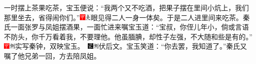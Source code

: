 一时摆上茶果吃茶，宝玉便说：“我两个又不吃酒，把果子摆在里间小炕上，我们那里坐去，省得闹你们。”{\includegraphics[width=3mm]{../Images/00002}\includegraphics[width=3mm]{../Images/00012}\footnotesize \kaishu 眼见得二人一身一体矣。}于是二人进里间来吃茶。秦氏一面张罗与凤姐摆酒果，一面忙进来嘱宝玉道：“宝叔，你侄儿年小，倘或言语不防头，你千万看着我，不要理他。他虽腼腆，却性子左强，不大随和些是有的。”{{\includegraphics[width=3mm]{../Images/00002}\includegraphics[width=3mm]{../Images/00011}\footnotesize \kaishu 实写秦钟，双映宝玉。　}\includegraphics[width=3mm]{../Images/00006}\includegraphics[width=3mm]{../Images/00011}\footnotesize \kaishu 伏后文。}宝玉笑道：“你去罢，我知道了。”秦氏又嘱了他兄弟一回，方去陪凤姐。

